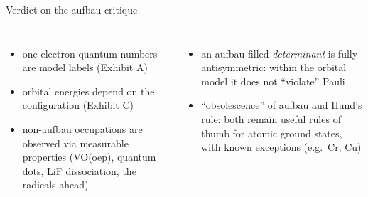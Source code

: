 \begin{frame}{Verdict on the aufbau critique}
  \begin{columns}[T]
    \begin{itemize}
      \item one-electron quantum numbers are model labels (Exhibit A)
      \item<2-> orbital energies depend on the configuration (Exhibit C)
      \item<3-> non-aufbau occupations are observed via measurable properties (VO(oep), quantum dots, LiF dissociation,
        the radicals ahead)
    \end{itemize}
    \begin{itemize}
      \item<4-> an aufbau-filled \emph{determinant} is fully antisymmetric: within the orbital model it does not ``violate'' Pauli
      \item<5-> ``obsolescence'' of aufbau and Hund's rule: both remain useful rules of thumb for atomic ground states,
        with known exceptions (e.g.\ Cr, Cu)
    \end{itemize}
  \end{columns}
\end{frame}
